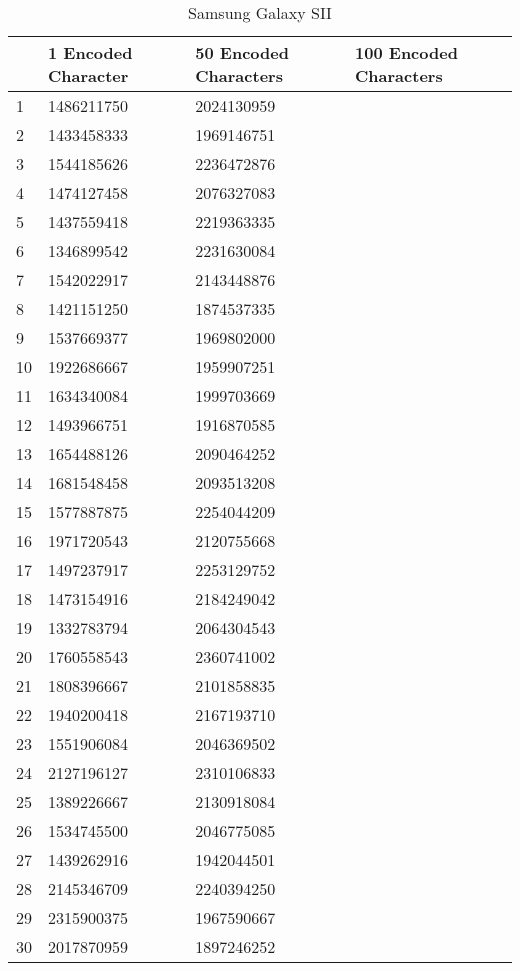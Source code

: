 	\begin{table}[ht!]
    		\caption{Samsung Galaxy SII} \label{tab:distamceGoogleGlassFull}
		\centering \begin{tabularx}{\textwidth}{l|X|X|X} \hline
		& \textbf{1 Encoded Character} & \textbf{50 Encoded Characters} & \textbf{100 Encoded Characters} \\ \hline \hline
       
		1&	1486211750	&	2024130959	&	\\ \hline
		2&	1433458333	&	1969146751	&	\\ \hline
		3&	1544185626	&	2236472876	&	\\ \hline
		4&	1474127458	&	2076327083	&	\\ \hline
		5&	1437559418	&	2219363335	&	\\ \hline
		6&	1346899542	&	2231630084	&	\\ \hline
		7&	1542022917	&	2143448876	&	\\ \hline
		8&	1421151250	&	1874537335	&	\\ \hline
		9&	1537669377	&	1969802000	&	\\ \hline
		10&	1922686667	&	1959907251	&	\\ \hline
		11&	1634340084	&	1999703669	&	\\ \hline
		12&	1493966751	&	1916870585	&	\\ \hline
		13&	1654488126	&	2090464252	&	\\ \hline
		14&	1681548458	&	2093513208	&	\\ \hline
		15&	1577887875	&	2254044209	&	\\ \hline
		16&	1971720543	&	2120755668	&	\\ \hline
		17&	1497237917	&	2253129752	&	\\ \hline
		18&	1473154916	&	2184249042	&	\\ \hline
		19&	1332783794	&	2064304543	&	\\ \hline
		20&	1760558543	&	2360741002	&	\\ \hline
		21&	1808396667	&	2101858835	&	\\ \hline
		22&	1940200418	&	2167193710	&	\\ \hline
		23&	1551906084	&	2046369502	&	\\ \hline
		24&	2127196127	&	2310106833	&	\\ \hline
		25&	1389226667	&	2130918084	&	\\ \hline
		26&	1534745500	&	2046775085	&	\\ \hline
		27&	1439262916	&	1942044501	&	\\ \hline
		28&	2145346709	&	2240394250	&	\\ \hline
		29&	2315900375	&	1967590667	&	\\ \hline
		30&	2017870959	&	1897246252	&	\\ \hline

		\end{tabularx}
	\end{table}
	
